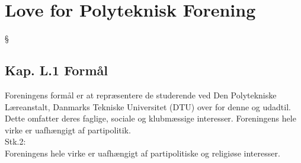 \setcounter{section}{12}
\section*{Love for Polyteknisk Forening}
\begin{list}
{\S {}}{}

\subsection{Kap. L.1 Formål}
\item Foreningens formål er at repræsentere de studerende ved Den Polytekniske Læreanstalt, Danmarks Tekniske Universitet (DTU) over for denne og udadtil. Dette omfatter deres faglige, sociale og klubmæssige interesser. Foreningens hele virke er uafhængigt af partipolitik. 
\\
Stk.2: \\
Foreningens hele virke er uafhængigt af partipolitiske og religiøse interesser.



\end{list}
